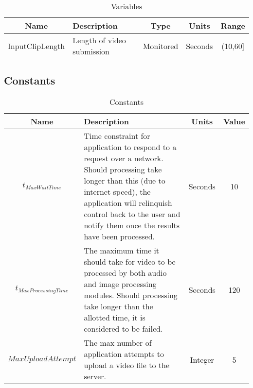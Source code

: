 \documentclass{article}
\begin{document}
\begin{table}[H]
    \caption{Variables}
    \centering
    \begin{tabularx}{\textwidth}{|c|X|c|c|c|}
        \hline
        \textbf{Name} & \textbf{Description} & \textbf{Type} & \textbf{Units} & \textbf{Range}\\
        \hline
        InputClipLength & Length of video submission & Monitored & Seconds & (10,60] \\
        \hline
    \end{tabularx}
    \label{tab:Variables}
\end{table}

\subsection{Constants}

\begin{table}[H]
    \caption{Constants}
    \centering
    \begin{tabularx}{\textwidth}{|c|X|c|c|}
        \hline
        \textbf{Name} & \textbf{Description} & \textbf{Units} & \textbf{Value}\\
        \hline
        $t_{MaxWaitTime}$ & Time constraint for application to respond to a request over a network. Should processing take longer than this (due to internet speed), the application will relinquish control back to the user and notify them once the results have been processed. & Seconds & 10 \\
        \hline
        $t_{MaxProcessingTime}$ & The maximum time it should take for video to be processed by both audio and image processing modules. Should processing take longer than the allotted time, it is considered to be failed. & Seconds & 120 \\
        \hline
        $MaxUploadAttempt$ & The max number of application attempts to upload a video file to the server. & Integer & 5 \\
        \hline
    \end{tabularx}
    \label{tab:Constants}
\end{table}
\end{document}
